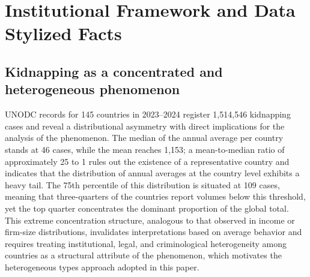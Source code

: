 \documentclass[ecta,nameyear,draft]{econsocart}
\theoremstyle{plain}
\theoremstyle{definition}
\newcommand{\1}{\mathbf{1}}
\begin{document}
\section{Institutional Framework and Data Stylized Facts}\label{sec:institutional}


\subsection{Kidnapping as a concentrated and heterogeneous phenomenon}

UNODC records \citet{unodc_Data} for 145 countries in 2023--2024 register 1,514,546 kidnapping cases and reveal a distributional asymmetry with direct implications for the analysis of the phenomenon. The median of the annual average per country stands at 46 cases, while the mean reaches 1,153; a mean-to-median ratio of approximately 25 to 1 rules out the existence of a representative country and indicates that the distribution of annual averages at the country level exhibits a heavy tail. The 75th percentile of this distribution is situated at 109 cases, meaning that three-quarters of the countries report volumes below this threshold, yet the top quarter concentrates the dominant proportion of the global total. This extreme concentration structure, analogous to that observed in income or firm-size distributions, invalidates interpretations based on average behavior and requires treating institutional, legal, and criminological heterogeneity among countries as a structural attribute of the phenomenon, which motivates the heterogeneous types approach adopted in this paper.
\end{document}
